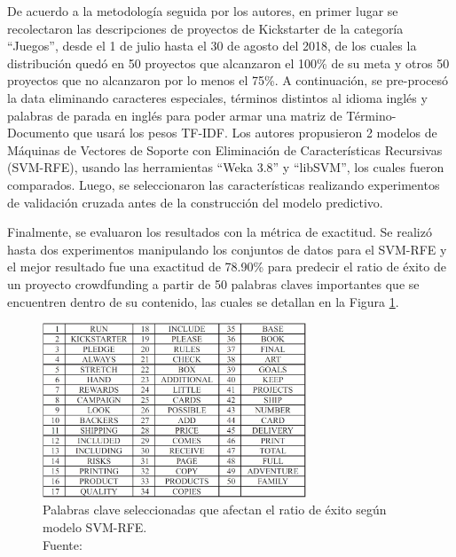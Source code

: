 De acuerdo a la metodología seguida por los autores, en primer lugar se recolectaron las descripciones de proyectos de Kickstarter de la categoría “Juegos”, desde el 1 de julio hasta el 30 de agosto del 2018, de los cuales la distribución quedó en 50 proyectos que alcanzaron el 100\% de su meta y otros 50 proyectos que no alcanzaron por lo menos el 75\%. A continuación, se pre-procesó la data eliminando caracteres especiales, términos distintos al idioma inglés y palabras de parada en inglés para poder armar una matriz de Término-Documento que usará los pesos TF-IDF. Los autores propusieron 2 modelos de Máquinas de Vectores de Soporte con Eliminación de Características Recursivas (SVM-RFE), usando las herramientas “Weka 3.8” y “libSVM”, los cuales fueron comparados. Luego, se seleccionaron las características realizando experimentos de validación cruzada antes de la construcción del modelo predictivo. 

Finalmente, se evaluaron los resultados con la métrica de exactitud.
Se realizó hasta dos experimentos manipulando los conjuntos de datos para el SVM-RFE y el mejor resultado fue una exactitud de 78.90\% para predecir el ratio de éxito de un proyecto crowdfunding a partir de 50 palabras claves importantes que se encuentren dentro de su contenido, las cuales se detallan en la Figura \ref{2:fig126}.

\begin{figure}[!ht]
	\begin{center}
		\includegraphics[width=0.70\textwidth]{2/figures/chen2019.jpg}
		\caption[Palabras clave seleccionadas que afectan el ratio de éxito según modelo SVM-RFE]{Palabras clave seleccionadas que afectan el ratio de éxito según modelo SVM-RFE.\\
			Fuente: \cite{pr_chen2019keywords_crowdfunding}}
		\label{2:fig126}
	\end{center}
\end{figure}

